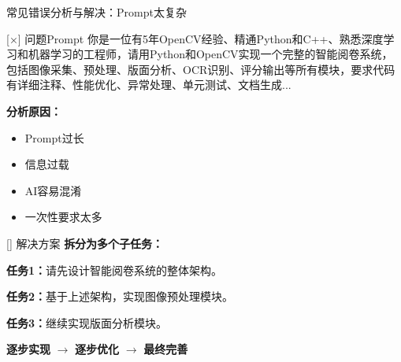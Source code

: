 \begin{frame}{常见错误分析与解决：Prompt太复杂}
	\begin{alertblock}{[×] 问题Prompt}
		你是一位有5年OpenCV经验、精通Python和C++、熟悉深度学习和机器学习的工程师，请用Python和OpenCV实现一个完整的智能阅卷系统，包括图像采集、预处理、版面分析、OCR识别、评分输出等所有模块，要求代码有详细注释、性能优化、异常处理、单元测试、文档生成...
	\end{alertblock}

	\vspace{0.3cm}

	\textbf{分析原因：}
	\begin{itemize}
		\item Prompt过长
		\item 信息过载
		\item AI容易混淆
		\item 一次性要求太多
	\end{itemize}

	\vspace{0.3cm}

	\begin{exampleblock}{[\checkmark] 解决方案}
		\textbf{拆分为多个子任务：}

		\vspace{0.2cm}

		\textbf{任务1：}请先设计智能阅卷系统的整体架构。

		\vspace{0.2cm}

		\textbf{任务2：}基于上述架构，实现图像预处理模块。

		\vspace{0.2cm}

		\textbf{任务3：}继续实现版面分析模块。

		\vspace{0.2cm}

		\textbf{逐步实现} $\rightarrow$ \textbf{逐步优化} $\rightarrow$ \textbf{最终完善}
	\end{exampleblock}
\end{frame}


